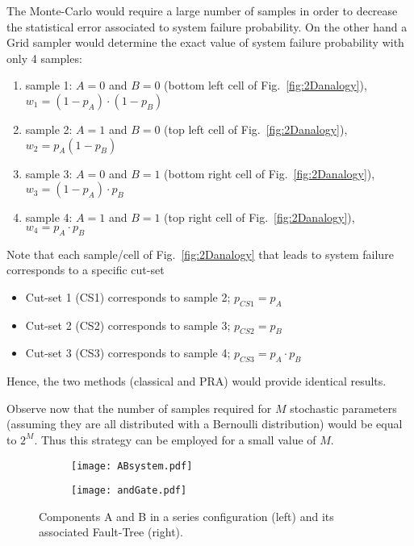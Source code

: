 The Monte-Carlo would require a large number of samples in order to decrease the statistical error associated
to system failure probability.
On the other hand a Grid sampler would determine the exact value of system failure probability with only 4 samples:
\begin{enumerate}
  \item sample 1: $A=0$ and $B=0$ (bottom left cell of Fig.~\ref{fig:2Danalogy}), $w_1 = (1-p_A) \cdot (1-p_B)$
  \item sample 2: $A=1$ and $B=0$ (top left cell of Fig.~\ref{fig:2Danalogy}), $w_2 = p_A (1-p_B)$
  \item sample 3: $A=0$ and $B=1$ (bottom right cell of Fig.~\ref{fig:2Danalogy}), $w_3 = (1-p_A) \cdot p_B$
  \item sample 4: $A=1$ and $B=1$ (top right cell of Fig.~\ref{fig:2Danalogy}), $w_4 = p_A \cdot p_B$
\end{enumerate}
Note that each sample/cell of Fig.~\ref{fig:2Danalogy} that leads to system failure corresponds to a specific cut-set
\begin{itemize}
  \item Cut-set 1 (CS1) corresponds to sample 2; $p_{CS1} = p_A$
  \item Cut-set 2 (CS2) corresponds to sample 3; $p_{CS2} = p_B$
  \item Cut-set 3 (CS3) corresponds to sample 4; $p_{CS3} = p_A \cdot p_B$
\end{itemize}
Hence, the two methods (classical and PRA) would provide identical results.

Observe now that the number of samples required for $M$ stochastic parameters (assuming they are all distributed with 
a Bernoulli distribution) would be equal to $2^M$. Thus this strategy can be employed for a small value of $M$.

\begin{figure}
  \centering
  \begin{subfigure}{.5\textwidth}
    \centering
    \texttt{[image: ABsystem.pdf]}
    \label{fig:sub1}
  \end{subfigure}%
  \begin{subfigure}{.5\textwidth}
    \centering
    \texttt{[image: andGate.pdf]}
    \label{fig:ABsystem}
  \end{subfigure}
  \caption{Components A and B in a series configuration (left) and its associated Fault-Tree (right).}
  \label{fig:ABsystem}
\end{figure}

